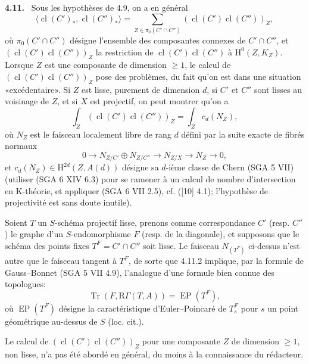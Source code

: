 \documentclass[11pt]{article}
\newenvironment{statement}[1]{\par\medskip\noindent\textbf{#1.}\ }{\par\medskip}
\renewcommand{\H}{\mathrm{H}}
\newcommand{\R}{\mathrm{R}}\newcommand{\RHomCore}{\mathrm{RHom}}
\providecommand{\cl}{\operatorname{cl}}
\providecommand{\Tr}{\operatorname{Tr}}
\providecommand{\EP}{\operatorname{EP}}
\providecommand{\Tr}{\operatorname{Tr}}
\providecommand{\Tr}{\operatorname{Tr}}
\providecommand{\R}{\mathrm R}
\providecommand{\Tr}{\operatorname{Tr}}
\providecommand{\cl}{\operatorname{cl}}
\providecommand{\EP}{\operatorname{EP}}
\providecommand{\cl}{\operatorname{cl}}
\providecommand{\Tr}{\operatorname{Tr}}
\begin{document}
\begin{statement}{4.11}
Sous les hypothèses de 4.9, on a en général
\begin{equation}
\tag{4.11.1}
\langle \cl(C')_*,\cl(C'')_*\rangle
=
\sum_{Z\in\pi_0(C'\cap C'')}(\cl(C')\cl(C''))_Z,
\end{equation}
où $\pi_0(C'\cap C'')$ désigne l'ensemble des composantes connexes de $C'\cap C''$, et $(\cl(C')\cl(C''))_Z$ la restriction de $\cl(C')\cl(C'')$ à $\H^0(Z,K_Z)$. Lorsque $Z$ est une composante de dimension $\geq 1$, le calcul de $(\cl(C')\cl(C''))_Z$ pose des problèmes, du fait qu'on est dans une situation «excédentaire». Si $Z$ est lisse, purement de dimension $d$, si $C'$ et $C''$ sont lisses au voisinage de $Z$, et si $X$ est projectif, on peut montrer qu'on a
\begin{equation}
\tag{4.11.2}
\int_Z(\cl(C')\cl(C''))_Z=\int_Z c_d(N_Z),
\end{equation}
où $N_Z$ est le faisceau localement libre de rang $d$ défini par la suite exacte de fibrés normaux
\[
0\longrightarrow N_{Z/C'}\oplus N_{Z/C''}\longrightarrow N_{Z/X}\longrightarrow N_Z\longrightarrow 0,
\]
et $c_d(N_Z)\in \H^{2d}(Z,A(d))$ désigne sa $d$-ième classe de Chern (SGA 5 VII) (utiliser (SGA 6 XIV 6.3) pour se ramener à un calcul de nombre d'intersection en K-théorie, et appliquer (SGA 6 VII 2.5), cf. ([10] 4.1); l'hypothèse de projectivité est sans doute inutile).

Soient $T$ un $S$-schéma projectif lisse, prenons comme correspondance $C'$ (resp. $C''$) le graphe d'un $S$-endomorphisme $F$ (resp. de la diagonale), et supposons que le schéma des points fixes $T^F=C'\cap C''$ soit lisse. Le faisceau $N_{(T^F)}$ ci-dessus n'est autre que le faisceau tangent à $T^F$, de sorte que 4.11.2 implique, par la formule de Gauss--Bonnet (SGA 5 VII 4.9), l'analogue d'une formule bien connue des topologues:
\begin{equation}
\tag{4.11.3}
\Tr(F,\R\Gamma(T,A))=\EP(T^F),
\end{equation}
où $\EP(T^F)$ désigne la caractéristique d'Euler--Poincaré de $T_s^F$ pour $s$ un point géométrique au-dessus de $S$ (loc. cit.).
\end{statement}

Le calcul de $(\cl(C')\cl(C''))_Z$ pour une composante $Z$ de dimension $\geq 1$, non lisse, n'a pas été abordé en général, du moins à la connaissance du rédacteur.
\end{document}
